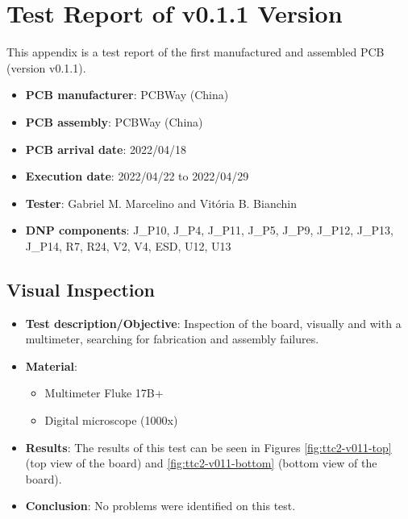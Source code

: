 %
%
%
%
%

%
%
%
%
%

\chapter{Test Report of v0.1.1 Version} \label{anx:test-report-v011}

This appendix is a test report of the first manufactured and assembled PCB (version v0.1.1).

\begin{itemize}
    \item \textbf{PCB manufacturer}: PCBWay (China)
    \item \textbf{PCB assembly}: PCBWay (China)
    \item \textbf{PCB arrival date}: 2022/04/18
    \item \textbf{Execution date}: 2022/04/22 to 2022/04/29
    \item \textbf{Tester}: Gabriel M. Marcelino and Vitória B. Bianchin
    \item \textbf{DNP components}: J\_P10, J\_P4, J\_P11, J\_P5, J\_P9, J\_P12, J\_P13, J\_P14, R7, R24, V2, V4, ESD, U12, U13
\end{itemize}

\section{Visual Inspection}

\begin{itemize}
    \item \textbf{Test description/Objective}: Inspection of the board, visually and with a multimeter, searching for fabrication and assembly failures.
    \item \textbf{Material}:
        \begin{itemize}
            \item Multimeter Fluke 17B+
            \item Digital microscope (1000x)
        \end{itemize}
    \item \textbf{Results}: The results of this test can be seen in Figures \ref{fig:ttc2-v011-top} (top view of the board) and \ref{fig:ttc2-v011-bottom} (bottom view of the board).
    \item \textbf{Conclusion}: No problems were identified on this test.
\end{itemize}

